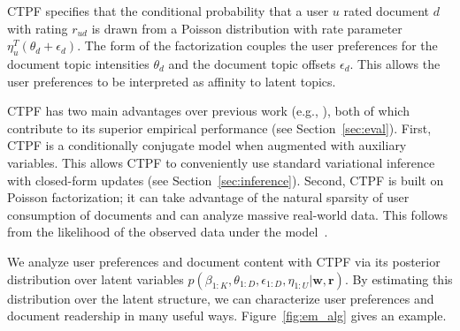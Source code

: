 \documentclass{article}
\newcommand{\mysec}[1]{Section~\ref{sec:#1}}
\newcommand{\myfig}[1]{Figure~\ref{fig:#1}}
\newcommand{\commentout}[1]{}
\begin{document}
CTPF specifies that the conditional probability that a user $u$ rated
document $d$ with rating $r_{ud}$ is drawn from a Poisson distribution
with rate parameter $\eta_u^T (\theta_d + \epsilon_d)$. The form of
the factorization couples the user preferences for the document topic
intensities $\theta_d$ and the document topic offsets
$\epsilon_d$. This allows the user preferences to be interpreted as
affinity to latent topics.

CTPF has two main advantages over previous work (e.g., \cite{Wang:2011a}), both of which contribute to its superior
empirical performance (see \mysec{eval}). First, CTPF is a
conditionally conjugate model when augmented with auxiliary
variables. This allows CTPF to conveniently use standard variational
inference with closed-form updates (see \mysec{inference}). Second,
CTPF is built on Poisson factorization; it can take advantage of the
natural sparsity of user consumption of documents and can analyze
massive real-world data. This follows from the likelihood of the
observed data under the model~\cite{Gopalan:2013b}.

We analyze user preferences and document content with CTPF via its
posterior distribution over latent variables $p(\beta_{1:K},
\theta_{1:D}, \epsilon_{1:D}, \eta_{1:U} | \bm{w}, \bm{r})$. By
estimating this distribution over the latent structure, we can
characterize user preferences and document readership in many useful
ways. \myfig{em_alg} gives an example.

\commentout{
Figure 1 gives an example. The plots visualize the estimated topic intensities
and the topic offsets for two articles in the Mendeley dataset. We analyzed
the full dataset consisting of 80,000 articles and 260,000 readers, and
selected two popular articles, one each in the fields of Optimization and
Statistics. Each article exhibits topic intensities relevant to its main field,
but the topic offsets reveal the readership in external fields.  The classic
statistics article in Figure 1 exhibits ``Algorithms'' and ``Bayesian
inference'' topics, but the user library patterns reveal interest from a wide
range of scientists, including scientists who work in the fields of ``Image
processing'' and ``Networks''. 
}
\end{document}
